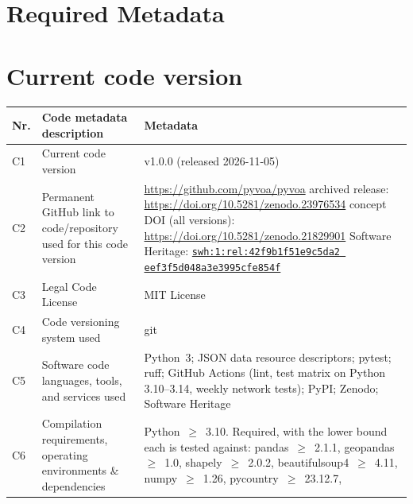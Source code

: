 \documentclass[preprint,12pt,a4paper]{elsarticle}
\begin{document}

\clearpage
\section*{Required Metadata}
\label{metadata}

\section*{Current code version}

  \begin{table}[!ht]
  \small
  \begin{tabular}{|l|>{\raggedright\arraybackslash}p{5.0cm}|>{\raggedright\arraybackslash}p{6.7cm}|}
  \hline
  \textbf{Nr.} & \textbf{Code metadata description} & \textbf{Metadata} \\
  \hline
  C1 & Current code version & v1.0.0 (released 2026-11-05) \\
  \hline
  C2 & Permanent GitHub link to code/repository used for this code version &
  \url{https://github.com/pyvoa/pyvoa} \newline
  archived release: \url{https://doi.org/10.5281/zenodo.23976534} \newline
  concept DOI (all versions): \url{https://doi.org/10.5281/zenodo.21829901} \newline
  Software Heritage: \href{https://archive.softwareheritage.org/swh:1:rel:42f9b1f51e9c5da2eef3f5d048a3e3995cfe854f;origin=https://github.com/pyvoa/pyvoa}{\texttt{swh:1:rel:42f9b1f5\allowbreak 1e9c5da2\allowbreak
  eef3f5d0\allowbreak 48a3e399\allowbreak 5cfe854f}} \\
  \hline
  C3 & Legal Code License & MIT License \\
  \hline
  C4 & Code versioning system used & git \\
  \hline
  C5 & Software code languages, tools, and services used &
  Python~3; JSON data resource descriptors; pytest; ruff; GitHub Actions (lint, test
  matrix on Python 3.10--3.14, weekly network tests); PyPI; Zenodo; Software Heritage \\
  \hline
  C6 & Compilation requirements, operating environments \& dependencies &
  Python~$\geq$~3.10. Required, with the lower bound each is tested against:
  pandas~$\geq$~2.1.1, geopandas~$\geq$~1.0, shapely~$\geq$~2.0.2,
  beautifulsoup4~$\geq$~4.11, numpy~$\geq$~1.26, pycountry~$\geq$~23.12.7,

\end{tabular}
\end{table}
\end{document}
